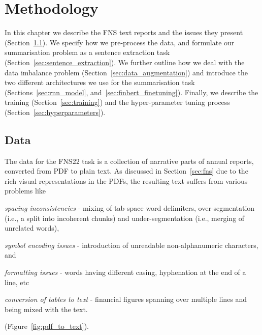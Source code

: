 \chapter{Methodology}\label{ch:methodology}
In this chapter we describe the FNS text reports and the issues they present (Section~\ref{sec:data}).
We specify how we pre-process the data, and formulate our summarisation problem as a sentence extraction task (Section~\ref{sec:sentence_extraction}).
We further outline how we deal with the data imbalance problem (Section~\ref{sec:data_augmentation}) and introduce the
two different architectures we use for the summarisation task (Sections~\ref{sec:rnn_model}, and~\ref{sec:finbert_finetuning}).
Finally, we describe the training (Section~\ref{sec:training}) and the hyper-parameter tuning process (Section~\ref{sec:hyperparameters}).

\section{Data}\label{sec:data}
The data for the FNS22 task is a collection of narrative parts of annual reports, converted from PDF to plain text.
As discussed in Section~\ref{sec:fns} due to the rich visual representations in the PDFs, the resulting text suffers from various problems like
\begin{enumerate*}[label=(\alph*)]
    \item \emph{spacing inconsistencies} - mixing of tab-space word delimiters, over-segmentation (i.e., a split into incoherent chunks) and under-segmentation (i.e., merging of unrelated words),
    \item \emph{symbol encoding issues} - introduction of unreadable non-alphanumeric characters, and
    \item \emph{formatting issues} - words having different casing, hyphenation at the end of a line, etc
    \item \emph{conversion of tables to text} - financial figures spanning over multiple lines and being mixed with the text.
\end{enumerate*} (Figure~\ref{fig:pdf_to_text}).

